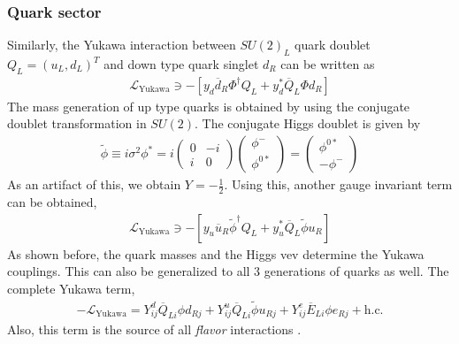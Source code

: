 \subsubsection{Quark sector}
\vspace{-0.3cm}
Similarly, the Yukawa interaction between $SU(2)_L$ quark doublet $Q_L=\left(u_{L}, d_{L}\right)^{T}$ and down type quark singlet $d_R$ can be written as 
\begin{eqnarray}\label{downType}
\mathcal{L}_{\mathrm{Yukawa}} \ni-\left[y_{d} \overline{d}_{R} \Phi^{\dagger} Q_{L}+y_{d}^{*} \overline{Q}_{L} \Phi d_{R}\right]
\end{eqnarray}
The mass generation of up type quarks is obtained by using the conjugate doublet transformation in $SU(2)$. The conjugate Higgs doublet is given by
\begin{eqnarray}
\tilde{\phi} \equiv i \sigma^{2} \phi^{*}=i\left(\begin{array}{cc}{0} & {-i} \\ {i} & {0}\end{array}\right)\left(\begin{array}{c}{\phi^{-}} \\ {\phi^{0 *}}\end{array}\right)=\left(\begin{array}{c}{\phi^{0 *}} \\ {-\phi^{-}}\end{array}\right)
\end{eqnarray}
As an artifact of this, we obtain $Y=-\frac{1}{2}$. Using this, another gauge invariant term can be obtained,
\begin{eqnarray}\label{upType}
\mathcal{L}_{\mathrm{Yukawa}} \ni-\left[y_{u} \overline{u}_{R} \tilde{\phi}^{\dagger} Q_{L}+y_{u}^{*} \overline{Q}_{L} \tilde{\phi} u_{R}\right]
\end{eqnarray}
As shown before, the quark masses and the Higgs vev determine the Yukawa couplings.  This can also be generalized to all 3 generations of quarks as well. The complete Yukawa term,
 \begin{eqnarray}\label{SMYukawa}
 -\mathcal{L}_{\mathrm{Yukawa}}=Y_{i j}^{d} \overline{Q}_{L i} \phi d_{R j}+Y_{i j}^{u} \overline{Q}_{L i} \tilde{\phi} u_{R j}+Y_{i j}^{e} \overline{E}_{L i} \phi e_{R j}+\mathrm{h.c.}
 \end{eqnarray}
Also, this term is the source of all \textit{flavor} interactions \cite{Isidori:2010kg}. 
